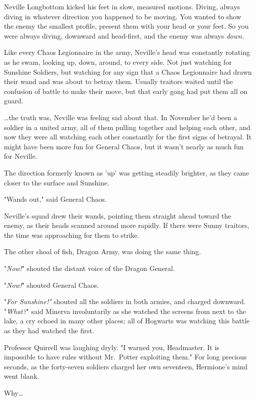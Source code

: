 Neville Longbottom kicked his feet in slow, measured motions. Diving, always 
diving in whatever direction you happened to be moving. You wanted to show the 
enemy the smallest profile, present them with your head or your feet. So you 
were always diving, downward and head-first, and the enemy was always 
\emph{down.}

Like every Chaos Legionnaire in the army, Neville's head was constantly 
rotating as he swam, looking up, down, around, to every side. Not just watching 
for Sunshine Soldiers, but watching for any sign that a Chaos Legionnaire had 
drawn their wand and was about to betray them. Usually traitors waited until 
the confusion of battle to make their move, but that early gong had put them 
all on guard.

{\ldots}the truth was, Neville was feeling sad about that. In November he'd 
been a soldier in a united army, all of them pulling together and helping each 
other, and now they were all watching each other constantly for the first signs 
of betrayal. It might have been more fun for General Chaos, but it wasn't 
nearly as much fun for Neville.

The direction formerly known as 'up' was getting steadily brighter, as they 
came closer to the surface and Sunshine.

"Wands out," said General Chaos.

Neville's squad drew their wands, pointing them straight ahead toward the 
enemy, as their heads scanned around more rapidly. If there were Sunny 
traitors, the time was approaching for them to strike.

The other shoal of fish, Dragon Army, was doing the same thing.

"\emph{Now!}" shouted the distant voice of the Dragon General.

"\emph{Now!}" shouted General Chaos.

"\emph{For Sunshine!"} shouted all the soldiers in both armies, and charged 
downward.
\sbreak
"\emph{What?}" said Minerva involuntarily as she watched the screens from next 
to the lake, a cry echoed in many other places; all of Hogwarts was watching 
this battle as they had watched the first.

Professor Quirrell was laughing dryly. "I warned you, Headmaster. It is 
impossible to have rules without Mr.~Potter exploiting them."
\sbreak
For long precious seconds, as the forty-seven soldiers charged her own 
seventeen, Hermione's mind went blank.

Why{\ldots}

